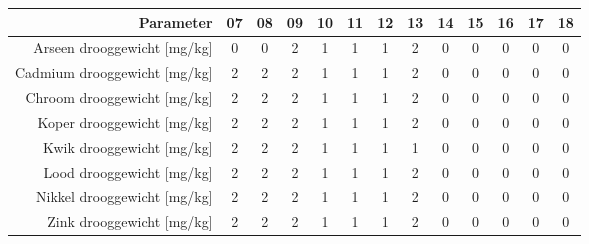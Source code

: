 \begin{tabular}{ r |c | c | c | c | c |c | c | c | c | c | c | c } 
\rowcolor[HTML]{EFEFEF}  
 Parameter & 07 & 08 & 09 & 10 & 11 & 12 & 13 & 14 & 15 & 16 & 17 & 18 \\    \hline     
Arseen drooggewicht [mg/kg] &0 & 0 & 2 & 1 & 1 & 1 & 2 & 0 & 0 & 0 & 0 & 0 \\
Cadmium drooggewicht [mg/kg] &2 & 2 & 2 & 1 & 1 & 1 & 2 & 0 & 0 & 0 & 0 & 0 \\
Chroom drooggewicht [mg/kg] &2 & 2 & 2 & 1 & 1 & 1 & 2 & 0 & 0 & 0 & 0 & 0 \\
Koper drooggewicht [mg/kg] &2 & 2 & 2 & 1 & 1 & 1 & 2 & 0 & 0 & 0 & 0 & 0 \\
Kwik drooggewicht [mg/kg] &2 & 2 & 2 & 1 & 1 & 1 & 1 & 0 & 0 & 0 & 0 & 0 \\
Lood drooggewicht [mg/kg] &2 & 2 & 2 & 1 & 1 & 1 & 2 & 0 & 0 & 0 & 0 & 0 \\
Nikkel drooggewicht [mg/kg] &2 & 2 & 2 & 1 & 1 & 1 & 2 & 0 & 0 & 0 & 0 & 0 \\
Zink drooggewicht [mg/kg] &2 & 2 & 2 & 1 & 1 & 1 & 2 & 0 & 0 & 0 & 0 & 0 \\
\end{tabular}    
